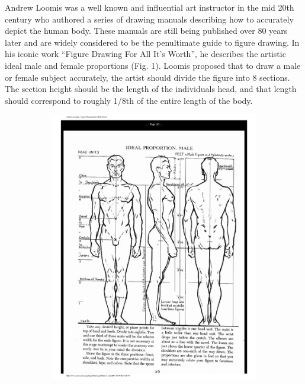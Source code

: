 \documentclass[]{article}
\begin{document}
Andrew Loomis was a well known and influential art instructor in the mid
20th century who authored a series of drawing manuals describing how to
accurately depict the human body. These manuals are still being
published over 80 years later and are widely considered to be the
penultimate guide to figure drawing\citep{harris:2000}. In his iconic
work ``Figure Drawing For All It's Worth'', he describes the artistic
ideal male and female proportions (Fig. 1). Loomis proposed that to draw
a male or female subject accurately, the artist should divide the figure
into 8 sections. The section height should be the length of the
individuals head, and that length should correspond to roughly 1/8th of
the entire length of the body.

\begin{figure}[!ht]
    \begin{subfigure}[h]{0.5\textwidth}
    \centering
            \includegraphics{figures/Loomis1.pdf}

\end{subfigure}
\end{figure}
\end{document}
